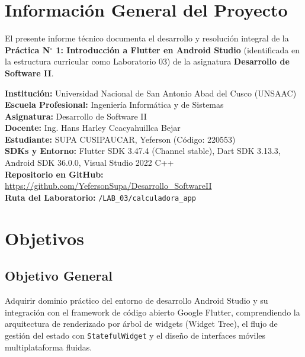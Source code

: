 \documentclass[12pt,a4paper]{article}
\begin{document}
\section{Información General del Proyecto}

El presente informe técnico documenta el desarrollo y resolución integral de la \textbf{Práctica N$^\circ$ 1: Introducción a Flutter en Android Studio} (identificada en la estructura curricular como Laboratorio 03) de la asignatura \textbf{Desarrollo de Software II}. 

\begin{tcolorbox}[colback=calloutbg,colframe=calloutborder,title=\textbf{Ficha Técnica de la Práctica}]
\textbf{Institución:} Universidad Nacional de San Antonio Abad del Cusco (UNSAAC)\\
\textbf{Escuela Profesional:} Ingeniería Informática y de Sistemas\\
\textbf{Asignatura:} Desarrollo de Software II\\
\textbf{Docente:} Ing. Hans Harley Ccacyahuillca Bejar\\
\textbf{Estudiante:} SUPA CUSIPAUCAR, Yeferson (Código: 220553)\\
\textbf{SDKs y Entorno:} Flutter SDK 3.47.4 (Channel stable), Dart SDK 3.13.3, Android SDK 36.0.0, Visual Studio 2022 C++\\
\textbf{Repositorio en GitHub:} \url{https://github.com/YefersonSupa/Desarrollo_SoftwareII}\\
\textbf{Ruta del Laboratorio:} \texttt{/LAB\_03/calculadora\_app}
\end{tcolorbox}

\section{Objetivos}

\subsection{Objetivo General}
Adquirir dominio práctico del entorno de desarrollo Android Studio y su integración con el framework de código abierto Google Flutter, comprendiendo la arquitectura de renderizado por árbol de widgets (Widget Tree), el flujo de gestión del estado con \texttt{StatefulWidget} y el diseño de interfaces móviles multiplataforma fluidas.
\end{document}
